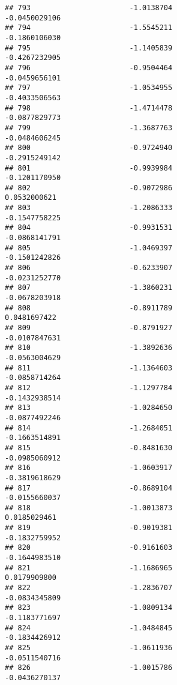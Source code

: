 \documentclass[
]{article}
\begin{document}
\begin{verbatim}
## 793                       -1.0138704                         -0.0450029106
## 794                       -1.5545211                         -0.1860106030
## 795                       -1.1405839                         -0.4267232905
## 796                       -0.9504464                         -0.0459656101
## 797                       -1.0534955                         -0.4033506563
## 798                       -1.4714478                         -0.0877829773
## 799                       -1.3687763                         -0.0484606245
## 800                       -0.9724940                         -0.2915249142
## 801                       -0.9939984                         -0.1201170950
## 802                       -0.9072986                          0.0532000621
## 803                       -1.2086333                         -0.1547758225
## 804                       -0.9931531                         -0.0868141791
## 805                       -1.0469397                         -0.1501242826
## 806                       -0.6233907                         -0.0231252770
## 807                       -1.3860231                         -0.0678203918
## 808                       -0.8911789                          0.0481697422
## 809                       -0.8791927                         -0.0107847631
## 810                       -1.3892636                         -0.0563004629
## 811                       -1.1364603                         -0.0858714264
## 812                       -1.1297784                         -0.1432938514
## 813                       -1.0284650                         -0.0877492246
## 814                       -1.2684051                         -0.1663514891
## 815                       -0.8481630                         -0.0985060912
## 816                       -1.0603917                         -0.3819618629
## 817                       -0.8689104                         -0.0155660037
## 818                       -1.0013873                          0.0185029461
## 819                       -0.9019381                         -0.1832759952
## 820                       -0.9161603                         -0.1644983510
## 821                       -1.1686965                          0.0179909800
## 822                       -1.2836707                         -0.0834345809
## 823                       -1.0809134                         -0.1183771697
## 824                       -1.0484845                         -0.1834426912
## 825                       -1.0611936                         -0.0511540716
## 826                       -1.0015786                         -0.0436270137

\end{verbatim}
\end{document}
